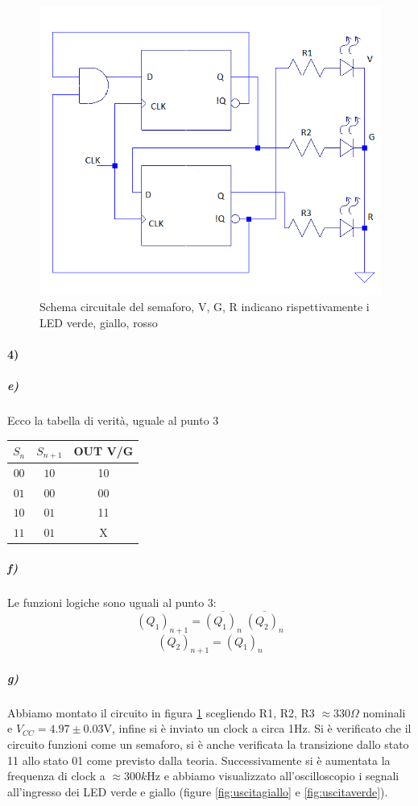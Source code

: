 \documentclass{article}
\begin{document}
		\begin{figure}
			\centering
			\includegraphics[width=0.7\linewidth]{foto/circuito}
			\caption{Schema circuitale del semaforo, V, G, R indicano rispettivamente i LED verde, giallo, rosso}
			\label{fig:circuito}
		\end{figure}

\paragraph{4)}
	\subparagraph{e)}
		Ecco la tabella di verità, uguale al punto 3
	\begin{center}
		\begin{tabular}{ccc}
			\hline
			$S_n$ & $S_{n+1}$ &OUT V/G\\
			\hline
			$00$ & $10$ & 10\\
			$01$ & $00$ & 00\\
			$10$ & $01$ & 11\\
			$11$ & $01$ & X\\
			\hline
		\end{tabular}
	\end{center}
	
	\subparagraph{f)}
		Le funzioni logiche sono uguali al punto 3:
		\[
		(Q_1)_{n+1}=\overline{(Q_1)_n} \; \overline{(Q_2)_n}
		\]
		\[
		(Q_2)_{n+1}=(Q_1)_n
		\]
	\subparagraph{g)}
		Abbiamo montato il circuito in figura \ref{fig:circuito} scegliendo R1, R2, R3 $\approx 330 \Omega$ nominali e $V_{CC}=4.97\pm0.03$V, infine si è inviato un clock a circa 1Hz. Si è verificato che il circuito funzioni come un semaforo, si è anche verificata la transizione dallo stato 11 allo stato 01 come previsto dalla teoria. Successivamente si è aumentata la frequenza di clock a $\approx300k$Hz e abbiamo visualizzato all'oscilloscopio i segnali all'ingresso dei LED verde e giallo (figure \ref{fig:uscitagiallo} e \ref{fig:uscitaverde}).
		
\end{document}

